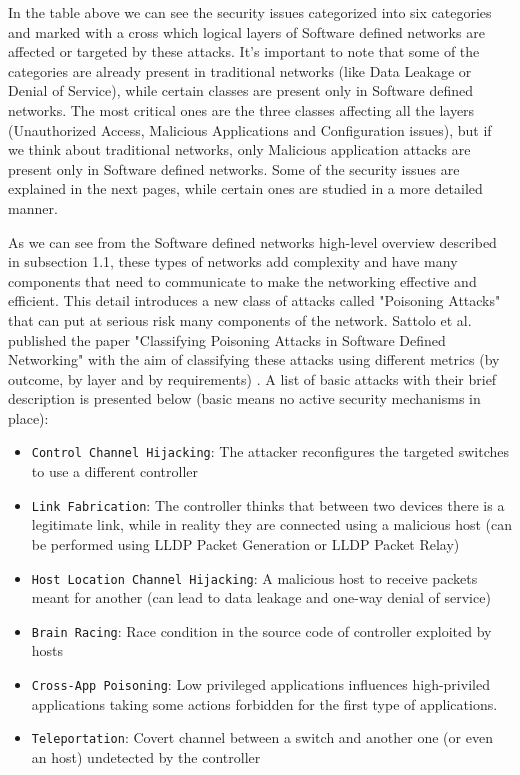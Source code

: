In the table above we can see the security issues categorized into six categories and marked with a cross which logical layers of Software defined networks are affected or targeted by these attacks. It's important to note that some of the categories are already present in traditional networks (like Data Leakage or Denial of Service), while certain classes are present only in Software defined networks. The most critical ones are the three classes affecting all the layers (Unauthorized Access, Malicious Applications and Configuration issues), but if we think about traditional networks, only Malicious application attacks are present only in Software defined networks. Some of the security issues are explained in the next pages, while certain ones are studied in a more detailed manner.

As we can see from the Software defined networks high-level overview described in subsection 1.1, these types of networks add complexity and have many components that need to communicate to make the networking effective and efficient. This detail introduces a new class of attacks called "Poisoning Attacks" that can put at serious risk many components of the network. Sattolo et al. published the paper "Classifying Poisoning Attacks in Software Defined Networking" with the aim of classifying these attacks using different metrics (by outcome, by layer and by requirements) \cite{class-poison-attacks}. A list of basic attacks with their brief description is presented below (basic means no active security mechanisms in place):

\begin{itemize}
  \item \texttt{Control Channel Hijacking}: The attacker reconfigures the targeted switches to use a different controller
  \item \texttt{Link Fabrication}: The controller thinks that between two devices there is a legitimate link, while in reality they are connected using a malicious host (can be performed using LLDP Packet Generation or LLDP Packet Relay) 
  \item \texttt{Host Location Channel Hijacking}: A malicious host to receive packets meant for another (can lead to data leakage and one-way denial of service)
  \item \texttt{Brain Racing}: Race condition in the source code of controller exploited by hosts 
  \item \texttt{Cross-App Poisoning}: Low privileged applications influences high-priviled applications taking some actions forbidden for the first type of applications. 
  \item \texttt{Teleportation}: Covert channel between a switch and another one (or even an host) undetected by the controller
\end{itemize}

